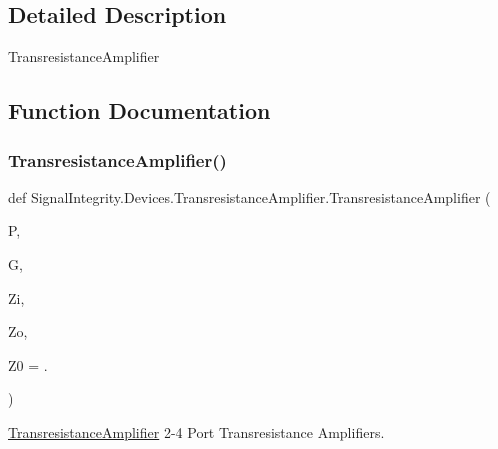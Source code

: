 \subsection{Detailed Description}
\begin{DoxyVerb}TransresistanceAmplifier\end{DoxyVerb}
 

\subsection{Function Documentation}
\mbox{\label{namespaceSignalIntegrity_1_1Devices_1_1TransresistanceAmplifier_a9ff76e46141bb878459e8d63b0886c88}} 
\subsubsection{\texorpdfstring{Transresistance\+Amplifier()}{TransresistanceAmplifier()}}
{\footnotesize\ttfamily def Signal\+Integrity.\+Devices.\+Transresistance\+Amplifier.\+Transresistance\+Amplifier (\begin{DoxyParamCaption}\item[{}]{P,  }\item[{}]{G,  }\item[{}]{Zi,  }\item[{}]{Zo,  }\item[{}]{Z0 = {.} }\end{DoxyParamCaption})}



\hyperlink{namespaceSignalIntegrity_1_1Devices_1_1TransresistanceAmplifier}{Transresistance\+Amplifier} 2-\/4 Port Transresistance Amplifiers. 


